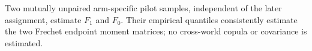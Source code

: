 Two mutually unpaired arm-specific pilot samples, independent of the later assignment, estimate \(F_1\) and \(F_0\).  Their empirical quantiles consistently estimate the two Frechet endpoint moment matrices; no cross-world copula or covariance is estimated.